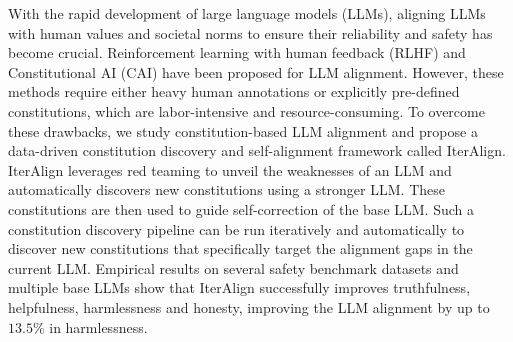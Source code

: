 With the rapid development of large language models (LLMs), aligning LLMs with human values and societal norms to ensure their reliability and safety has become crucial. Reinforcement learning with human feedback (RLHF) and Constitutional AI (CAI) have been proposed for LLM alignment. However, these methods require either heavy human annotations or explicitly pre-defined constitutions, which are labor-intensive and resource-consuming. To overcome these drawbacks, we study constitution-based LLM alignment and propose a data-driven constitution discovery and self-alignment framework called IterAlign. IterAlign leverages red teaming to unveil the weaknesses of an LLM and automatically discovers new constitutions using a stronger LLM. These constitutions are then used to guide self-correction of the base LLM. Such a constitution discovery pipeline can be run iteratively and automatically to discover new constitutions that specifically target the alignment gaps in the current LLM. Empirical results on several safety benchmark datasets and multiple base LLMs show that IterAlign successfully improves truthfulness, helpfulness, harmlessness and honesty, improving the LLM alignment by up to $13.5\%$ in harmlessness.